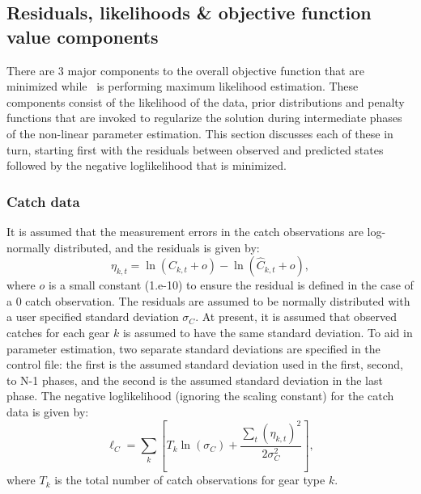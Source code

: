 \begin{multicols}{2}
\subsection{Residuals, likelihoods \& objective function value components}
There are 3 major components to the overall objective function that are minimized while \iscam\ is performing maximum likelihood estimation.  These components consist of the likelihood of the data, prior distributions and penalty functions that are invoked to regularize the solution during intermediate phases of the non-linear parameter estimation.  This section discusses each of these in turn, starting first with the residuals between observed and predicted states followed by the negative loglikelihood that is minimized.

\subsubsection{Catch data}
It is assumed that the measurement errors in the catch observations are log-normally distributed, and the residuals is given by:
\begin{equation}\label{eq2}
\eta_{k,t}=\ln(C_{k,t}+o) -  \ln(\hat{C}_{k,t}+o),
\end{equation}
where $o$ is  a small constant (1.e-10) to ensure the residual is defined in the case of a 0 catch observation.  The residuals are assumed to be normally distributed with a user specified standard deviation $\sigma_{C}$.  At present, it is assumed that observed catches for each gear $k$ is assumed to have the same standard deviation.  To aid in parameter estimation, two separate standard deviations are specified in the control file: the first is the assumed standard deviation used in the first, second, to N-1 phases, and the second is the assumed standard deviation in the last phase.  The negative loglikelihood (ignoring the scaling constant) for the catch data is given by:
\begin{equation}\label{eq3}
\ell_C = \sum_k\left[  T_k\ln(\sigma_C)+\frac{\sum_t(\eta_{k,t})^2}{2\sigma_C^2}\right],
\end{equation}
where $T_k$ is the total number of catch observations for gear type $k$.



\end{multicols}
